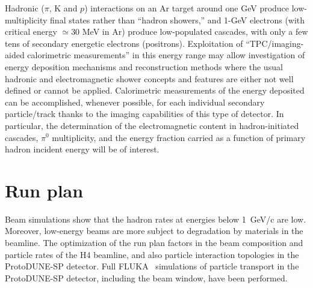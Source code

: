  Hadronic ($\pi$, K and $p$) interactions on an Ar target around one GeV produce low-multiplicity final states rather than ``hadron showers,'' 
 and 1-GeV electrons  (with critical energy $\simeq 30$ MeV in Ar) produce low-populated cascades, with only a few tens of secondary energetic electrons (positrons). 
Exploitation of ``TPC/imaging-aided calorimetric measurements'' in this energy range may allow investigation of 
energy deposition mechanisms and reconstruction methods where the usual hadronic and electromagnetic shower concepts and features are either not well defined or cannot be applied.
Calorimetric measurements of the energy deposited can be accomplished,  whenever possible, for each individual secondary particle/track thanks to the imaging capabilities of this type of detector.
In particular, the determination of the electromagnetic  content in hadron-initiated cascades, $\pi^0$ multiplicity, and the energy fraction carried as a function of primary hadron incident energy will be of interest.


\section{Run plan}
\label{sec:runplan}


Beam simulations show that the hadron rates at 
energies below 1~GeV/c are low. Moreover, low-energy beams are more
subject to degradation by materials in the
beamline.  The optimization of the run plan factors in the beam composition and particle rates of the H4 beamline, and 
also particle interaction topologies in the ProtoDUNE-SP detector. Full FLUKA~%
simulations of particle transport in the ProtoDUNE-SP detector, including the
beam window, have been performed.


